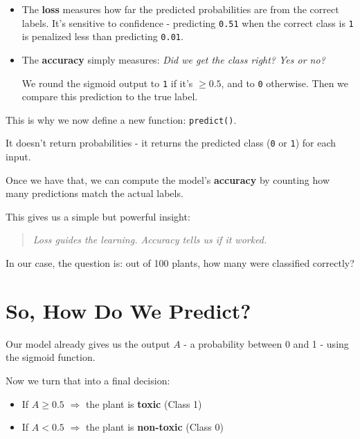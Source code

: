 \documentclass[11pt]{article}
\begin{document}
\begin{tcolorbox}[colback=gray!4, colframe=gray!60!black, title=What's the difference?]
\begin{itemize}
    \item The \textbf{loss} measures how far the predicted probabilities are from the correct labels.  
    It's sensitive to confidence - predicting \texttt{0.51} when the correct class is \texttt{1} is penalized less than predicting \texttt{0.01}.
    
    \item The \textbf{accuracy} simply measures:  
    \textit{Did we get the class right? Yes or no?}  

    We round the sigmoid output to \texttt{1} if it's $\geq 0.5$, and to \texttt{0} otherwise.  
    Then we compare this prediction to the true label.
\end{itemize}
\end{tcolorbox}

\bigskip

This is why we now define a new function: \texttt{predict()}.

It doesn't return probabilities - it returns the predicted class (\texttt{0} or \texttt{1}) for each input.

Once we have that, we can compute the model's \textbf{accuracy} by counting how many predictions match the actual labels.

\medskip

\vspace{0.3em}
\noindent This gives us a simple but powerful insight:

\begin{quote}
\textit{Loss guides the learning. Accuracy tells us if it worked.}
\end{quote}

In our case, the question is: out of 100 plants, how many were classified correctly?

\section*{So, How Do We Predict?}

Our model already gives us the output $A$ - a probability between 0 and 1 - using the sigmoid function.

Now we turn that into a final decision:

\begin{itemize}
    \item If $A \geq 0.5$ $\Rightarrow$ the plant is \textbf{toxic} (Class 1)
    \item If $A < 0.5$ $\Rightarrow$ the plant is \textbf{non-toxic} (Class 0)
\end{itemize}
\end{document}
